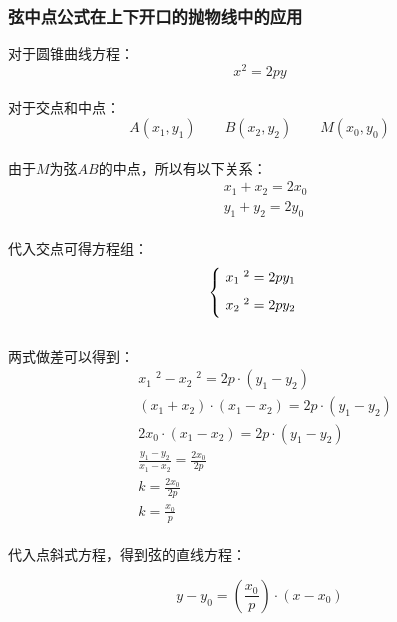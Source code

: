 \documentclass[UTF8]{ctexart}
\begin{document}
\newpage

\subsubsection{弦中点公式在上下开口的抛物线中的应用}
    对于圆锥曲线方程：
    \setcounter{equation}{0}
    \begin{equation}
        x^2=2py
    \end{equation}\\
    对于交点和中点：
    \begin{equation}
        A(x_1,y_1)\qquad B(x_2,y_2)\qquad M(x_0,y_0)
    \end{equation}\\
    由于$M$为弦$AB$的中点，所以有以下关系：
    \begin{align}
        &x_1+x_2=2x_0\\[2mm]
        &y_1+y_2=2y_0
    \end{align}\\
    代入交点可得方程组：
    \begin{equation}
        \begin{cases}
            \ x_1\;^2=2py_1\\[2mm]
            \ x_2\;^2=2py_2\vspace{2pt}
        \end{cases}
    \end{equation}\\[1mm]
    两式做差可以得到：
    \begin{align}
        &x_1\;^2-x_2\;^2=2p\cdot(y_1-y_2)\\[3mm]
        &(x_1+x_2)\cdot(x_1-x_2)=2p\cdot(y_1-y_2)\\[3mm]
        &2x_0\cdot(x_1-x_2)=2p\cdot(y_1-y_2)\\[3mm]
        &\frac{y_1-y_2}{x_1-x_2}=\frac{2x_0}{2p}\\[3mm]
        &k=\frac{2x_0}{2p}\\[3mm]
        &k=\frac{x_0}{p}
    \end{align}\\
    代入点斜式方程，得到弦的直线方程：
    \begin{large}
        \begin{equation*}
            y-y_0=\left(\frac{x_0}{p}\right)\cdot(x-x_0)
        \end{equation*}
    \end{large}

\newpage
\end{document}
